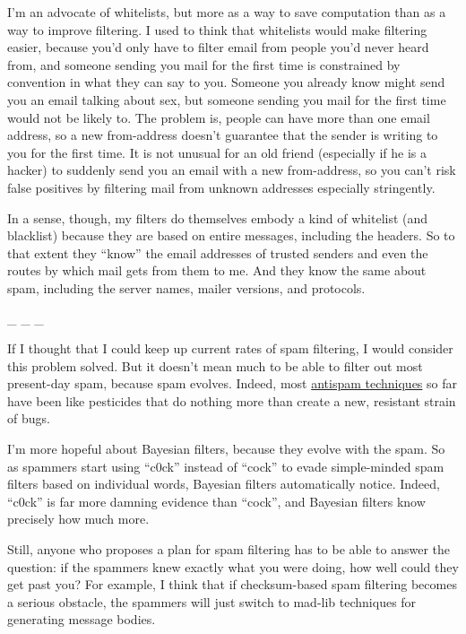 I'm an advocate of whitelists, but more as a way to save computation
than as a way to improve filtering. I used to think that whitelists
would make filtering easier, because you'd only have to filter email
from people you'd never heard from, and someone sending you mail for the
first time is constrained by convention in what they can say to you.
Someone you already know might send you an email talking about sex, but
someone sending you mail for the first time would not be likely to. The
problem is, people can have more than one email address, so a new
from-address doesn't guarantee that the sender is writing to you for the
first time. It is not unusual for an old friend (especially if he is a
hacker) to suddenly send you an email with a new from-address, so you
can't risk false positives by filtering mail from unknown addresses
especially stringently.

In a sense, though, my filters do themselves embody a kind of whitelist
(and blacklist) because they are based on entire messages, including the
headers. So to that extent they ``know'' the email addresses of trusted
senders and even the routes by which mail gets from them to me. And they
know the same about spam, including the server names, mailer versions,
and protocols.

\_ \_ \_

If I thought that I could keep up current rates of spam filtering, I
would consider this problem solved. But it doesn't mean much to be able
to filter out most present-day spam, because spam evolves. Indeed, most
\href{falsepositives.html}{antispam techniques} so far have been like
pesticides that do nothing more than create a new, resistant strain of
bugs.

I'm more hopeful about Bayesian filters, because they evolve with the
spam. So as spammers start using ``c0ck'' instead of ``cock'' to evade
simple-minded spam filters based on individual words, Bayesian filters
automatically notice. Indeed, ``c0ck'' is far more damning evidence than
``cock'', and Bayesian filters know precisely how much more.

Still, anyone who proposes a plan for spam filtering has to be able to
answer the question: if the spammers knew exactly what you were doing,
how well could they get past you? For example, I think that if
checksum-based spam filtering becomes a serious obstacle, the spammers
will just switch to mad-lib techniques for generating message bodies.

